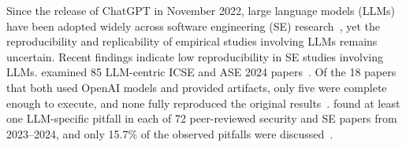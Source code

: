 \documentclass[smallextended]{svjour3}
\begin{document}
Since the release of ChatGPT in November 2022, large language models (LLMs) have been adopted widely across software engineering (SE) research~\cite{DBLP:journals/tosem/HouZLYWLLLGW24}, yet the reproducibility and replicability of empirical studies involving LLMs remains uncertain.
Recent findings indicate low reproducibility in SE studies involving LLMs.
\citeauthor{DBLP:journals/corr/abs-2510-25506} examined 85 LLM-centric ICSE and ASE 2024 papers~\cite{DBLP:journals/corr/abs-2510-25506}.
Of the 18 papers that both used OpenAI models and provided artifacts, only five were complete enough to execute, and none fully reproduced the original results~\cite{DBLP:journals/corr/abs-2510-25506}.
\citeauthor{DBLP:conf/ndss/EvertzRNMNSGPSS26} found at least one LLM-specific pitfall in each of 72 peer-reviewed security and SE papers from 2023--2024, and only 15.7\% of the observed pitfalls were discussed~\cite{DBLP:conf/ndss/EvertzRNMNSGPSS26}.
\end{document}
